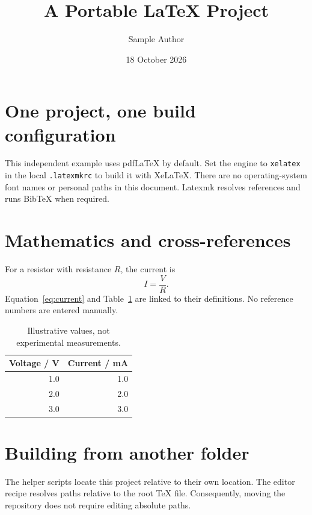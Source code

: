 \documentclass[a4paper,11pt]{article}
\title{A Portable LaTeX Project}
\author{Sample Author}
\date{18 October 2026}
\begin{document}
\maketitle
\section{One project, one build configuration}
This independent example uses pdfLaTeX by default. Set the engine to
\texttt{xelatex} in the local \texttt{.latexmkrc} to build it with XeLaTeX.
There are no operating-system font names or personal paths in this document.
Latexmk resolves references and runs BibTeX when required\cite{latexmk}.

\section{Mathematics and cross-references}
\label{sec:math}
For a resistor with resistance \(R\), the current is
\begin{equation}
  I=\frac{V}{R}.
  \label{eq:current}
\end{equation}
Equation~\eqref{eq:current} and Table~\ref{tab:measurements} are linked to their
definitions. No reference numbers are entered manually.

\begin{table}[htbp]
  \centering
  \caption{Illustrative values, not experimental measurements.}
  \label{tab:measurements}
  \begin{tabular}{rr}
    \toprule
    Voltage / V & Current / mA \\
    \midrule
    1.0 & 1.0 \\
    2.0 & 2.0 \\
    3.0 & 3.0 \\
    \bottomrule
  \end{tabular}
\end{table}

\section{Building from another folder}
The helper scripts locate this project relative to their own location.
The editor recipe resolves paths relative to the root TeX file.
Consequently, moving the repository does not require editing absolute paths.



\end{document}
